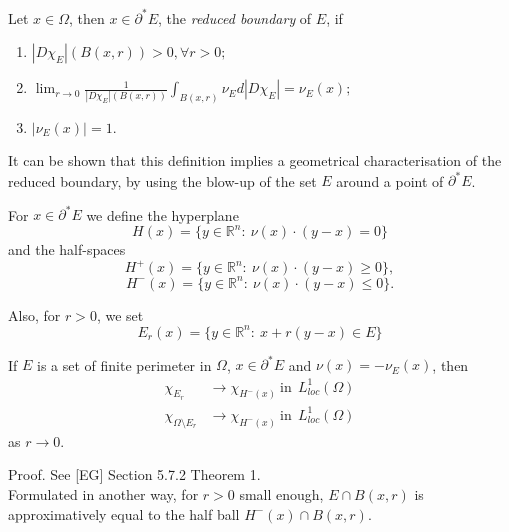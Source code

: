 \begin{definition} \label{reducedboundary} Let $x \in \Omega$, then $x \in \partial^{*}E$, the {\em reduced boundary} of $E$, if
\begin{enumerate}
	\item $|D\chi_{E}|(B(x,r)) > 0, \forall r >0;$
	\item $\lim_{r \to 0} \frac{1}{|D\chi_{E}|(B(x,r))} \int_{B(x,r)} \nu_{E} d|D\chi_{E}| = \nu_{E} (x);$
	\item $|\nu_{E}(x)| = 1.$
\end{enumerate}
\end{definition}

It can be shown that this definition implies a geometrical characterisation of the reduced boundary, by using the blow-up of the set $E$ around a point of $\partial^{*} E$.

\begin{definition} For $x \in \partial^{*}E$ we define the hyperplane
\[H(x) = \{ y \in \mathbb{R}^{n} : \ \nu(x) \cdot (y - x) = 0 \} \]
and the half-spaces
\[H^{+}(x) = \{ y \in \mathbb{R}^{n} : \ \nu(x) \cdot (y - x) \ge 0 \}, \]
\[H^{-}(x) = \{ y \in \mathbb{R}^{n} : \ \nu(x) \cdot (y - x) \le 0 \}. \]

Also, for $r > 0$, we set
\[ E_{r} (x) = \{ y \in \mathbb{R}^{n} : \ x + r(y - x) \in E \} \]
\end{definition}

\begin{theorem} \label{convblowup} If $E$ is a set of finite perimeter in $\Omega$, $x \in \partial^{*}E$ and $\nu(x) = - \nu_{E}(x)$, then
\begin{align*} \chi_{E_{r}} & \to \chi_{H^{-}(x)}  \ \mathrm{in} \ \ L^{1}_{loc}(\Omega) \\
\chi_{\Omega \setminus E_{r}} & \to \chi_{H^{-}(x)}  \ \mathrm{in} \ \ L^{1}_{loc}(\Omega) \end{align*}
as $r \to 0$.
\end{theorem}

Proof. See [EG] Section 5.7.2 Theorem 1.
\\

Formulated in another way, for $r > 0$ small enough, $E \cap B(x, r)$ is approximatively equal to the half ball $H^{-}(x) \cap B(x, r)$.

